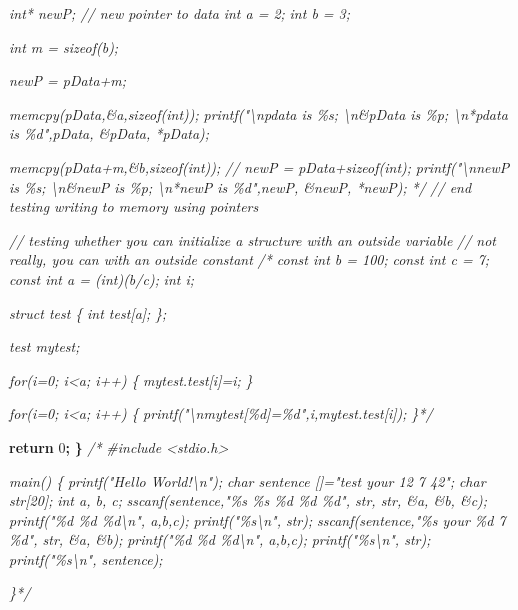 \documentclass[
]{book}
\newenvironment{Shaded}{\begin{snugshade}}{\end{snugshade}}
\newcommand{\CommentTok}[1]{\textcolor[rgb]{0.56,0.35,0.01}{\textit{#1}}}
\newcommand{\ControlFlowTok}[1]{\textcolor[rgb]{0.13,0.29,0.53}{\textbf{#1}}}
\newcommand{\DecValTok}[1]{\textcolor[rgb]{0.00,0.00,0.81}{#1}}
\newcommand{\OperatorTok}[1]{\textcolor[rgb]{0.81,0.36,0.00}{\textbf{#1}}}
\begin{document}
\begin{Shaded}
\begin{Highlighting}[]
\CommentTok{    int* newP; // new pointer to data}
\CommentTok{    int a = 2;}
\CommentTok{    int b = 3;}

\CommentTok{    int m = sizeof(b);}

\CommentTok{    newP = pData+m;}

\CommentTok{    memcpy(pData,\&a,sizeof(int));}
\CommentTok{    printf("\textbackslash{}npdata is \%s; \textbackslash{}n\&pData is \%p; \textbackslash{}n*pdata is \%d",pData, \&pData, *pData);}

\CommentTok{    memcpy(pData+m,\&b,sizeof(int));}
\CommentTok{//    newP = pData+sizeof(int);}
\CommentTok{    printf("\textbackslash{}nnewP is \%s; \textbackslash{}n\&newP is \%p; \textbackslash{}n*newP is \%d",newP, \&newP, *newP);}
\CommentTok{*/} \CommentTok{// end testing writing to memory using pointers}



    \CommentTok{// testing whether you can initialize a structure with an outside variable}
    \CommentTok{// not really, you can with an outside constant}
\CommentTok{/*    const int b = 100;}
\CommentTok{    const int c = 7;}
\CommentTok{    const int a = (int)(b/c);}
\CommentTok{    int i;}

\CommentTok{    struct test \{}
\CommentTok{        int test[a];}
\CommentTok{    \};}

\CommentTok{    test mytest;}

\CommentTok{    for(i=0; i\textless{}a; i++)}
\CommentTok{    \{}
\CommentTok{        mytest.test[i]=i;}
\CommentTok{    \}}

\CommentTok{    for(i=0; i\textless{}a; i++)}
\CommentTok{    \{}
\CommentTok{        printf("\textbackslash{}nmytest[\%d]=\%d",i,mytest.test[i]);}
\CommentTok{    \}*/}


    \ControlFlowTok{return} \DecValTok{0}\OperatorTok{;}
\OperatorTok{\}}
\CommentTok{/*}
\CommentTok{\#include \textless{}stdio.h\textgreater{}}

\CommentTok{main() \{}
\CommentTok{    printf("Hello World!\textbackslash{}n");}
\CommentTok{    char sentence []="test your 12 7 42";}
\CommentTok{    char str[20];}
\CommentTok{    int a, b, c;}
\CommentTok{    sscanf(sentence,"\%s \%s \%d \%d \%d", str, str, \&a, \&b, \&c);}
\CommentTok{    printf("\%d \%d \%d\textbackslash{}n", a,b,c);}
\CommentTok{    printf("\%s\textbackslash{}n", str);}
\CommentTok{    sscanf(sentence,"\%s your \%d 7 \%d", str, \&a, \&b);}
\CommentTok{    printf("\%d \%d \%d\textbackslash{}n", a,b,c);}
\CommentTok{    printf("\%s\textbackslash{}n", str);}
\CommentTok{    printf("\%s\textbackslash{}n", sentence);}

\CommentTok{\}*/}
\end{Highlighting}
\end{Shaded}
\end{document}
